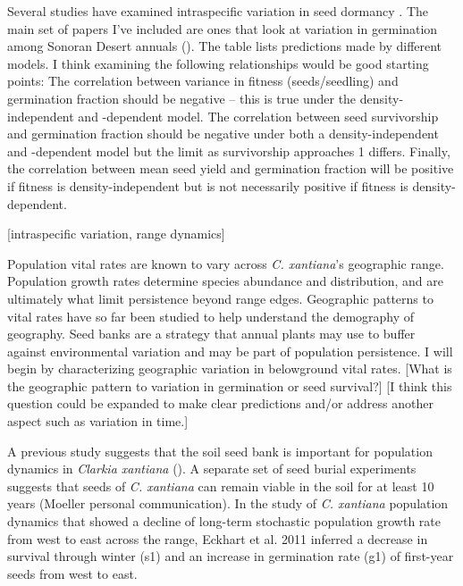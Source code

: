 \documentclass[12pt, oneside, titlepage]{article}   	%
\begin{document}
Several studies have examined intraspecific variation in seed dormancy \cite{hacker1984,hacker1989,philippi1993a,clauss2000}. The main set of papers I've included are ones that look at variation in germination among Sonoran Desert annuals (\cite{venable2007,gremer2014,gremer2016}). The table lists predictions made by different models. I think examining the following relationships would be good starting points: The correlation between variance in fitness (seeds/seedling) and germination fraction should be negative -- this is true under the density-independent and -dependent model. The correlation between seed survivorship and germination fraction should be negative under both a density-independent and -dependent model but the limit as survivorship approaches 1 differs. Finally, the correlation between mean seed yield and germination fraction will be positive if fitness is density-independent but is not necessarily positive if fitness is density-dependent.

[intraspecific variation, range dynamics]

Population vital rates are known to vary across \textit{C. xantiana}'s geographic range. Population growth rates determine species abundance and distribution, and are ultimately what limit persistence beyond range edges. Geographic patterns to vital rates have so far been studied to help understand the demography of geography. Seed banks are a strategy that annual plants may use to buffer against environmental variation and may be part of population persistence. I will begin by characterizing geographic variation in belowground vital rates. [What is the geographic pattern to variation in germination or seed survival?] [I think this question could be expanded to make clear predictions and/or address another aspect such as variation in time.]

A previous study suggests that the soil seed bank is important for population dynamics in \textit{Clarkia xantiana} (\cite{eckhart2011}). A separate set of seed burial experiments suggests that seeds of \textit{C. xantiana} can remain viable in the soil for at least 10 years (Moeller personal communication). In the study of \textit{C. xantiana} population dynamics that showed a decline of long-term stochastic population growth rate from west to east across the range, Eckhart et al. 2011 inferred a decrease in survival through winter (s1) and an increase in germination rate (g1) of first-year seeds from west to east.

\end{document}
